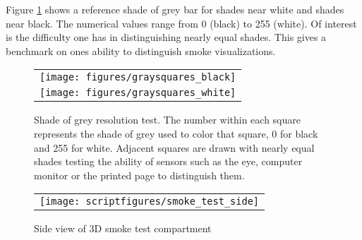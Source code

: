 \documentclass[11pt,twoside]{book}
\newcommand{\figoptions}{hbp}
\begin{document}
Figure \ref{figgraysquare} shows a reference shade of grey bar for shades near white and shades near black.
The numerical values range from 0 (black) to 255 (white).  Of interest is the difficulty one has in distinguishing nearly equal shades.  This gives a benchmark on ones ability to distinguish smoke visualizations.
\begin{figure}[\figoptions]
\begin{center}
 \centering
\begin{tabular}{c}
\texttt{[image: figures/graysquares\_black]}\\
\texttt{[image: figures/graysquares\_white]}\\
 \end{tabular}
\end{center}
 \caption[Shade of grey resolution test.]{Shade of grey resolution test.
 The number within each square represents the shade of grey used to color that square,
 0 for black and 255 for white.  Adjacent squares are drawn with nearly equal shades
 testing the ability of sensors such as the eye, computer monitor or the printed page
 to distinguish them.
 }
\label{figgraysquare}%
\end{figure}

\begin{figure}[\figoptions]
\begin{center}
 \centering
\begin{tabular}{c}
 \texttt{[image: scriptfigures/smoke\_test\_side]}
 \end{tabular}
\end{center}
 \caption[Side view of 3D smoke test compartment]{Side view of 3D smoke test compartment}
\label{figsmoketestgeom}%
\end{figure}
\end{document}
